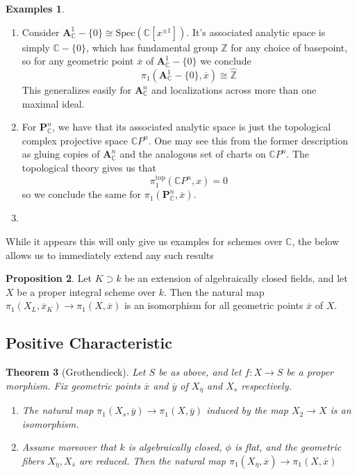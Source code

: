\documentclass{article}
\newtheorem{theorem}{Theorem}[section]
\theoremstyle{definition}
\newtheorem{proposition}[theorem]{Proposition}
\newtheorem{examples}[theorem]{Examples}
\theoremstyle{remark}
\newcommand{\C}{\mathbb{C}}
\newcommand{\Z}{\mathbb{Z}}
\begin{document}
\begin{examples} \text{}
	\begin{enumerate} 	\item Consider $\textbf{A}_{\C}^1 - \{0\} \cong \text{Spec}(\C[x^{\pm 1}])$. 
		It's associated analytic space is simply $\C - \{0\}$, which has fundamental group $\Z$ for any choice of basepoint, so for any geometric point $\overline{x}$ of $\textbf{A}_{\C}^1 - \{0\}$ we conclude
		\[\pi_1(\textbf{A}_{\C}^1 - \{0\}, \overline{x}) \cong \widehat{\Z}\]
		This generalizes easily for $\textbf{A}_{\C}^n$  and localizations across more than one maximal ideal. 
		\item For $\textbf{P}_{\C}^n$, we have that its associated analytic space is just the topological complex projective space $\C P^n$.
	One may see this from the former description as gluing copies of $\textbf{A}_{\C}^n$ and the analogous set of charts on $\C P^n$.
	The topological theory gives us that 
	\[\pi_1^{\text{top}}(\C P^n, x) = 0\]
	so we conclude the same for $\pi_1(\textbf{P}_{\C}^n, \overline{x})$.
\item  {}
\end{enumerate}
\end{examples}

While it appears this will only give us examples for schemes over $\C$, the below allows us to immediately extend any such results 
\begin{proposition}
	Let $K \supset k$ be an extension of algebraically closed fields, and let $X$ be a proper integral scheme over $k$.
	Then the natural map $\pi_1(X_L, \overline{x}_K) \to \pi_1(X, \overline{x})$ is an isomorphism for all geometric points $\overline{x}$ of $X$.
\end{proposition} 


\subsection{Positive Characteristic}

\begin{theorem}[Grothendieck]
	Let $S$ be as above, and let $f: X \to S$ be a proper morphism.
	Fix geometric points $\overline{x}$ and $\overline{y}$ of $X_{\overline{\eta}}$ and $X_s$ respectively.
	\begin{enumerate}
		\item The natural map $\pi_1(X_s, \overline{y}) \to \pi_1(X, \overline{y})$ induced by the map $X_2 \to X$ is an isomorphism.
		\item Assume moreover that $k$ is algebraically closed, $\phi$ is flat, and the geometric fibers $X_{\overline{\eta}}, X_{\overline{s}}$  are reduced.
			Then the natural map $\pi_1(X_{\overline{\eta}}, \overline{x}) \to \pi_1(X, \overline{x})$
	\end{enumerate}
	
\end{theorem}
\end{document}
